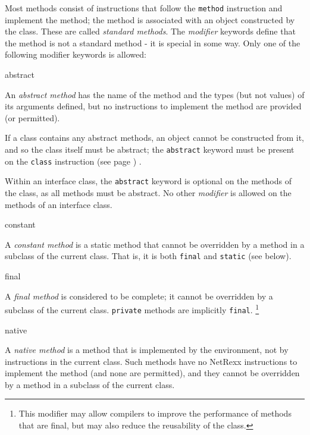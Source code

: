 Most methods consist of instructions that follow the \texttt{method}
instruction and implement the method; the method is associated with an
object constructed by the class.
These are called \emph{standard methods}.
The \emph{modifier} keywords define that the method is not a
standard method - it is special in some way.
Only one of the following modifier keywords is allowed:
\begin{description}
\item{abstract}

An \emph{abstract method} has the name of the method and the types
(but not values) of its arguments defined, but no instructions to
implement the method are provided (or permitted).
 
If a class contains any abstract methods, an object cannot be
constructed from it, and so the class itself must be abstract; the
\texttt{abstract} keyword must be present on the
 \texttt{class} instruction (see page \pageref{refclass}) .
 
Within an interface class, the \texttt{abstract} keyword is optional on
the methods of the class, as all methods must be abstract.  No other
\emph{modifier} is allowed on the methods of an interface class.
\item{constant}

A \emph{constant method} is a static method that cannot be
overridden by a method in a subclass of the current class.
That is, it is both \texttt{final} and \texttt{static} (see below).
\item{final}

A \emph{final method} is considered to be complete; it cannot be
overridden by a subclass of the current class.  \texttt{private} methods
are implicitly \texttt{final}.
\footnote{
This modifier may allow compilers to improve the performance of methods
that are final, but may also reduce the reusability of the class.
}
\item{native}

A \emph{native method} is a method that is implemented by the
environment, not by instructions in the current class.
Such methods have no NetRexx instructions to implement the method (and
none are permitted), and they cannot be overridden by a method in a
subclass of the current class.
 

\end{description}
